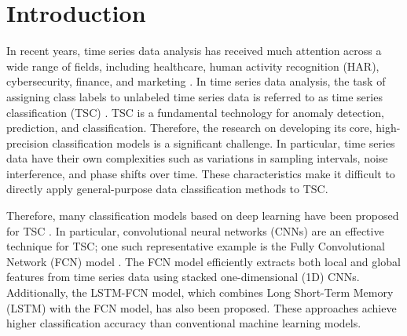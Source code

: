 \documentclass[conference]{IEEEtran}
\begin{document}
\section{Introduction}
In recent years, time series data analysis has received much attention across a wide range of fields, including healthcare, human activity recognition (HAR), cybersecurity, finance, and marketing \cite{Bunke2004DataMI}. In time series data analysis, the task of assigning class labels to unlabeled time series data is referred to as time series classification (TSC) \cite{10.1111/rssa.12636}. TSC is a fundamental technology for anomaly detection, prediction, and classification. Therefore, the research on developing its core, high-precision classification models is a significant challenge. In particular, time series data have their own complexities such as variations in sampling intervals, noise interference, and phase shifts over time. These characteristics make it difficult to directly apply general-purpose data classification methods to TSC.

Therefore, many classification models based on deep learning have been proposed for TSC \cite{10.1145/3649448}. In particular, convolutional neural networks (CNNs) \cite{9451544} are an effective technique for TSC; one such representative example is the Fully Convolutional Network (FCN) model \cite{7966039}. The FCN model efficiently extracts both local and global features from time series data using stacked one-dimensional (1D) CNNs. Additionally, the LSTM-FCN \cite{8141873} model, which combines Long Short-Term Memory (LSTM) \cite{6795963} with the FCN model, has also been proposed. These approaches achieve higher classification accuracy than conventional machine learning models.
\end{document}
